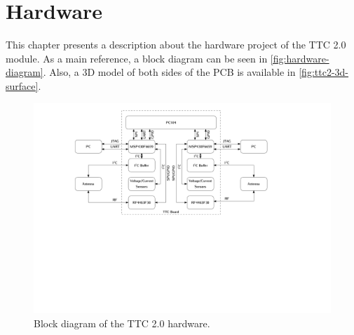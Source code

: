 %
%
%
%
%

%
%
%
%
%


\chapter{Hardware} \label{ch:hardware}

This chapter presents a description about the hardware project of the TTC 2.0 module. As a main reference, a block diagram can be seen in \autoref{fig:hardware-diagram}. Also, a 3D model of both sides of the PCB is available in \autoref{fig:ttc2-3d-surface}.

\begin{figure}[!h]
	\begin{center}
		\includegraphics[width=\textwidth]{figures/hardware_diagram.pdf}
		\caption{Block diagram of the TTC 2.0 hardware.}
		\label{fig:hardware-diagram}
	\end{center}
\end{figure}

